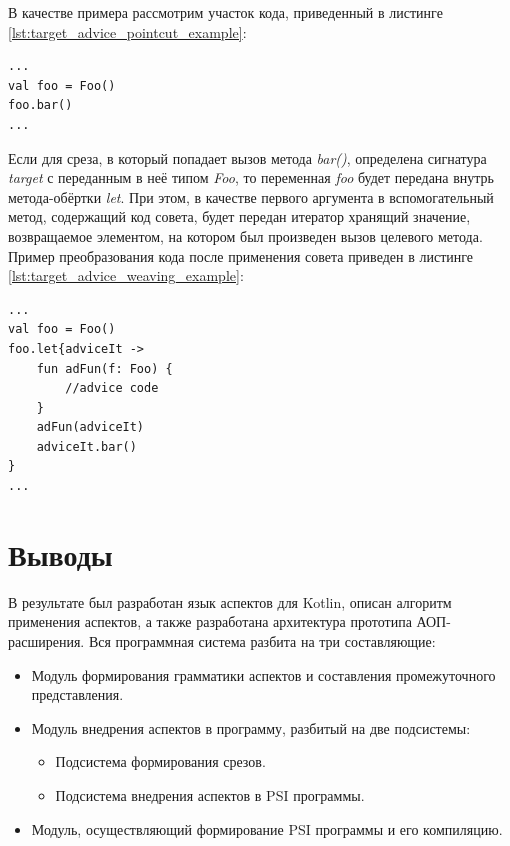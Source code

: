 В качестве примера рассмотрим участок кода, приведенный в листинге
\ref{lst:target_advice_pointcut_example}:
\begin{lstlisting}[style={java}, label=lst:target_advice_pointcut_example,
    caption={Пример точки внедрения}]
...
val foo = Foo()
foo.bar()
...
\end{lstlisting}
Если для среза, в который попадает вызов метода \textit{bar()}, определена
сигнатура \textit{target} с переданным в неё типом \textit{Foo}, то переменная
\textit{foo} будет передана внутрь метода-обёртки \textit{let}.
При этом, в качестве первого аргумента в вспомогательный метод, содержащий код совета, будет передан итератор хранящий значение, возвращаемое элементом, на котором был произведен вызов целевого метода.
Пример преобразования кода после применения совета приведен в листинге
\ref{lst:target_advice_weaving_example}:
\begin{lstlisting}[style={java}, label=lst:target_advice_weaving_example,
    caption={Пример применения совета, имеющего сигнатуру \textit{target}}]
...
val foo = Foo()
foo.let{adviceIt ->
	fun adFun(f: Foo) {
		//advice code
	}
	adFun(adviceIt)
	adviceIt.bar()
}
...
\end{lstlisting}

\section{Выводы}
\label{sec:design_conclusion}
В результате был разработан язык аспектов для Kotlin,
описан алгоритм применения аспектов, а также разработана архитектура прототипа АОП-расширения.
Вся программная система разбита на три составляющие:
\begin{itemize}
	\item Модуль формирования грамматики аспектов и составления промежуточного представления.
	\item Модуль внедрения аспектов в программу, разбитый на две подсистемы:
	\begin{itemize}
		\item Подсистема формирования срезов.
		\item Подсистема внедрения аспектов в PSI программы.
	\end{itemize}
	\item Модуль, осуществляющий формирование PSI программы и его компиляцию.
\end{itemize}
